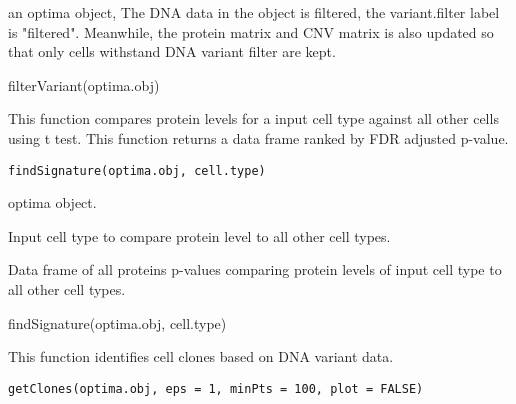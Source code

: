 \documentclass[a4paper]{book}
\begin{document}
%
\begin{Value}
an optima object, The DNA data in the object is filtered, the variant.filter label is "filtered".
Meanwhile, the protein matrix and CNV matrix is also updated so that only cells withstand DNA variant filter are kept.
\end{Value}
%
\begin{Examples}
\begin{ExampleCode}
filterVariant(optima.obj)
\end{ExampleCode}
\end{Examples}
%
\begin{Description}\relax
This function compares protein levels for a input cell type against all other
cells using t test. This function returns a data frame ranked by
FDR adjusted p-value.
\end{Description}
%
\begin{Usage}
\begin{verbatim}
findSignature(optima.obj, cell.type)
\end{verbatim}
\end{Usage}
%
\begin{Arguments}
\begin{ldescription}
\item[\code{optima.obj}] optima object.

\item[\code{cell.type}] Input cell type to compare protein level to all other cell types.
\end{ldescription}
\end{Arguments}
%
\begin{Value}
Data frame of all proteins p-values comparing protein levels of input
cell type to all other cell types.
\end{Value}
%
\begin{Examples}
\begin{ExampleCode}
findSignature(optima.obj, cell.type)
\end{ExampleCode}
\end{Examples}
%
\begin{Description}\relax
This function identifies cell clones based on DNA variant data.
\end{Description}
%
\begin{Usage}
\begin{verbatim}
getClones(optima.obj, eps = 1, minPts = 100, plot = FALSE)
\end{verbatim}
\end{Usage}
\end{document}
